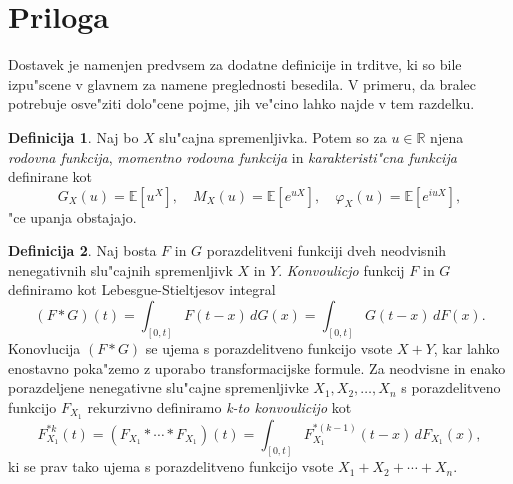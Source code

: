 \documentclass[12pt, a4paper, reqno]{amsart}
\theoremstyle{definition}
\newtheorem{definicija}{Definicija}[section]
\theoremstyle{plain}
\newcommand{\R}{\mathbb{R}}
\newcommand{\E}{\mathbb{E}}
\newcommand{\1}{\mathds{1}}
\begin{document}
        
        
        





\pagebreak

\section{Priloga}
    Dostavek je namenjen predvsem za dodatne definicije in trditve, ki so bile izpu"scene v glavnem
    za namene preglednosti besedila. V primeru, da bralec potrebuje osve"ziti dolo"cene pojme, 
    jih ve"cino lahko najde v tem razdelku.
    \begin{definicija}
        Naj bo $X$ slu"cajna spremenljivka. Potem so za $u\in\R$ njena \textit{rodovna funkcija}, 
        \textit{momentno rodovna funkcija} in \textit{karakteristi"cna funkcija} definirane 
        kot 
        \begin{equation*}
            G_X(u) = \E\left[u^X\right], \quad M_X(u) = \E\left[e^{uX}\right], \quad \varphi_X(u) = \E\left[e^{iuX}\right],
        \end{equation*}
        "ce upanja obstajajo.
        \label{def:rodovneFunkcije}
    \end{definicija}

    \begin{definicija}
        Naj bosta $F$ in $G$ porazdelitveni funkciji dveh neodvisnih nenegativnih slu"cajnih 
        spremenljivk $X$ in $Y$. \textit{Konvoulicjo} funkcij $F$ in $G$ definiramo kot
        Lebesgue-Stieltjesov integral
        \begin{equation*}
            (F*G)(t) = \int_{[0, t]}F(t - x)\, dG(x) = \int_{[0, t]}G(t - x)\, dF(x).
        \end{equation*} 
        Konovlucija $(F*G)$ se ujema s porazdelitveno funkcijo vsote $X + Y$, kar lahko 
        enostavno poka"zemo z uporabo transformacijske formule.
        Za neodvisne in enako porazdeljene nenegativne slu"cajne spremenljivke $X_1, X_2, \dots, X_n$ 
        s porazdelitveno funkcijo $F_{X_1}$ rekurzivno definiramo \textit{k-to konvoulicijo} kot
        \begin{equation*}
            F_{X_1}^{*k}(t) = (F_{X_1}*\cdots*F_{X_1})(t) = \int_{[0, t]}F_{X_1}^{*(k-1)}(t - x)\, dF_{X_1}(x),
        \end{equation*}
        ki se prav tako ujema s porazdelitveno funkcijo vsote $X_1 + X_2 + \cdots + X_n$. 
        \label{def:konvolucija}
    \end{definicija}
\end{document}

